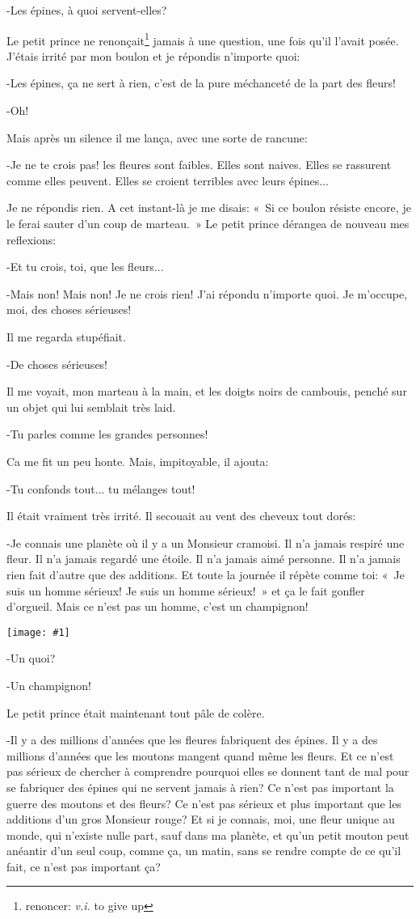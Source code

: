 \documentclass{report}
\newcommand{\pos}[1]{\textit{#1}}
\newcommand{\ft}[3][]{\footnote{%
\if\relax\detokenize{#1}\relax\else#1: \fi%
\if\relax\detokenize{#2}\relax\else\pos{#2} \fi%
#3}}
\newcommand{\incpic}[1]{%
\end{paracol}
\begin{center}
    \texttt{[image: \#1]}
\end{center}
\begin{paracol}{2}}
\begin{document}
\begin{paracol}{2}
-Les épines, à quoi servent-elles?

Le petit prince ne renonçait\ft[renoncer]{v.i.}{to give up} jamais à une question, une fois qu'il l'avait posée. J'étais irrité par mon boulon et je répondis n'importe quoi:

-Les épines, ça ne sert à rien, c'est de la pure méchanceté de la part des fleurs!

-Oh!

Mais après un silence il me lança, avec une sorte de rancune:

-Je ne te crois pas! les fleures sont faibles. Elles sont naives. Elles se rassurent comme elles peuvent. Elles se croient terribles avec leurs épines...

Je ne répondis rien. A cet instant-là je me disais: «~Si ce boulon résiste encore, je le ferai sauter d'un coup de marteau.~» Le petit prince dérangea de nouveau mes reflexions:

-Et tu crois, toi, que les fleurs...

-Mais non! Mais non! Je ne crois rien! J'ai répondu n'importe quoi. Je m'occupe, moi, des choses sérieuses!

Il me regarda stupéfiait.

-De choses sérieuses!

Il me voyait, mon marteau à la main, et les doigts noirs de cambouis, penché sur un objet qui lui semblait très laid.

-Tu parles comme les grandes personnes!

Ca me fit un peu honte. Mais, impitoyable, il ajouta:

-Tu confonds tout... tu mélanges tout!

Il était vraiment très irrité. Il secouait au vent des cheveux tout dorés:

-Je connais une planète où il y a un Monsieur cramoisi. Il n'a jamais respiré une fleur. Il n'a jamais regardé une étoile. Il n'a jamais aimé personne. Il n'a jamais rien fait d'autre que des additions. Et toute la journée il répète comme toi: «~Je suis un homme sérieux! Je suis un homme sérieux!~» et ça le fait gonfler d'orgueil. Mais ce n'est pas un homme, c'est un champignon! 

\incpic{pic/image17.jpeg}

-Un quoi?

-Un champignon!

Le petit prince était maintenant tout pâle de colère.

-Il y a des millions d'années que les fleures fabriquent des épines. Il y a des millions d'années que les moutons mangent quand même les fleurs. Et ce n'est pas sérieux de chercher à comprendre pourquoi elles se donnent tant de mal pour se fabriquer des épines qui ne servent jamais à rien? Ce n'est pas important la guerre des moutons et des fleurs? Ce n'est pas sérieux et plus important que les additions d'un gros Monsieur rouge? Et si je connais, moi, une fleur unique au monde, qui n'existe nulle part, sauf dans ma planète, et qu'un petit mouton peut anéantir d'un seul coup, comme ça, un matin, sans se rendre compte de ce qu'il fait, ce n'est pas important ça?


\end{paracol}
\end{document}
